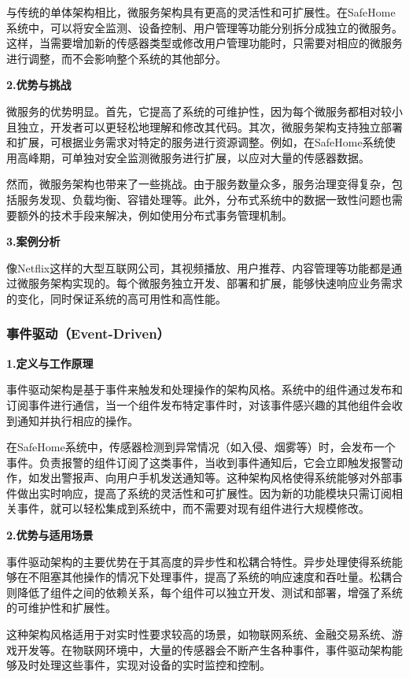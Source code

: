 与传统的单体架构相比，微服务架构具有更高的灵活性和可扩展性。在SafeHome系统中，可以将安全监测、设备控制、用户管理等功能分别拆分成独立的微服务。这样，当需要增加新的传感器类型或修改用户管理功能时，只需要对相应的微服务进行调整，而不会影响整个系统的其他部分。

\textbf{2.优势与挑战}

微服务的优势明显。首先，它提高了系统的可维护性，因为每个微服务都相对较小且独立，开发者可以更轻松地理解和修改其代码。其次，微服务架构支持独立部署和扩展，可根据业务需求对特定的服务进行资源调整。例如，在SafeHome系统使用高峰期，可单独对安全监测微服务进行扩展，以应对大量的传感器数据。

然而，微服务架构也带来了一些挑战。由于服务数量众多，服务治理变得复杂，包括服务发现、负载均衡、容错处理等。此外，分布式系统中的数据一致性问题也需要额外的技术手段来解决，例如使用分布式事务管理机制。

\textbf{3.案例分析}

像Netflix这样的大型互联网公司，其视频播放、用户推荐、内容管理等功能都是通过微服务架构实现的。每个微服务独立开发、部署和扩展，能够快速响应业务需求的变化，同时保证系统的高可用性和高性能。

\subsubsection{事件驱动（Event-Driven）}

\textbf{1.定义与工作原理}

事件驱动架构是基于事件来触发和处理操作的架构风格。系统中的组件通过发布和订阅事件进行通信，当一个组件发布特定事件时，对该事件感兴趣的其他组件会收到通知并执行相应的操作。

在SafeHome系统中，传感器检测到异常情况（如入侵、烟雾等）时，会发布一个事件。负责报警的组件订阅了这类事件，当收到事件通知后，它会立即触发报警动作，如发出警报声、向用户手机发送通知等。这种架构风格使得系统能够对外部事件做出实时响应，提高了系统的灵活性和可扩展性。因为新的功能模块只需订阅相关事件，就可以轻松集成到系统中，而不需要对现有组件进行大规模修改。

\textbf{2.优势与适用场景}

事件驱动架构的主要优势在于其高度的异步性和松耦合特性。异步处理使得系统能够在不阻塞其他操作的情况下处理事件，提高了系统的响应速度和吞吐量。松耦合则降低了组件之间的依赖关系，每个组件可以独立开发、测试和部署，增强了系统的可维护性和扩展性。

这种架构风格适用于对实时性要求较高的场景，如物联网系统、金融交易系统、游戏开发等。在物联网环境中，大量的传感器会不断产生各种事件，事件驱动架构能够及时处理这些事件，实现对设备的实时监控和控制。

